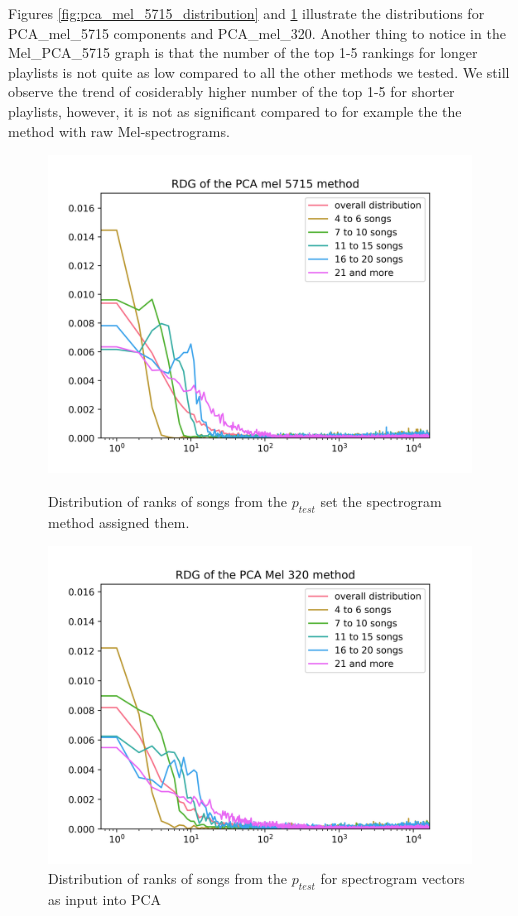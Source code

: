 Figures \ref{fig:pca_mel_5715_distribution} and \ref{fig:pca_mel_320_distribution} illustrate the distributions for PCA\_mel\_5715 components and PCA\_mel\_320. Another thing to notice in the Mel\_PCA\_{5715} graph is that the number of the top 1-5 rankings for longer playlists is not quite as low compared to all the other methods we tested. We still observe the trend of cosiderably higher number of the top 1-5 for shorter playlists, however, it is not as significant compared to for example the the method with raw Mel-spectrograms.
\begin{figure}[h]
\centering
\begin{minipage}{.45\textwidth}
  \centering
  \includegraphics[width=1\linewidth]{./img/pca_mel_5715_graph.png}
  \caption{Distribution of ranks of songs from the $p_{test}$ set the spectrogram method assigned them.}
  \label{fig:pca_mel_5715_distribution}
\end{minipage}%
\begin{minipage}{.45\textwidth}
  \centering
  \includegraphics[width=1\linewidth]{./img/pca_mel_320_graph.png}
  \caption{Distribution of ranks of songs from the $p_{test}$ for spectrogram vectors as input into PCA}
  \label{fig:pca_mel_320_distribution}
\end{minipage}
\end{figure}\label{fig:pca_mel_comparison_graps}


